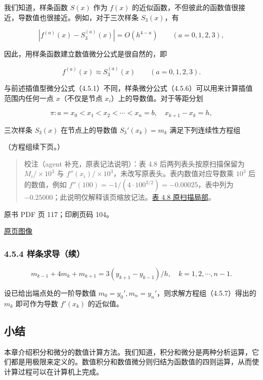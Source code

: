 我们知道，样条函数 \(S(x)\) 作为 \(f(x)\) 的近似函数，不但彼此的函数值很接近，导数值也很接近。例如，对于三次样条 \(S_3(x)\)，有

\[
|f^{(a)}(x)-S_3^{(a)}(x)|=O(h^{4-a})\qquad(a=0,1,2,3),
\]

因此，用样条函数建立数值微分公式是很自然的，即

\[
f^{(a)}(x)\approx S_3^{(a)}(x)\qquad(a=0,1,2,3).
\tag{4.5.6}
\]

与前述插值型微分公式（4.5.1）不同，样条微分公式（4.5.6）可以用来计算插值范围内任何一点 \(x\)（不仅是节点 \(x_i\)）上的导数值。对于等距分划

\[
\pi:a=x_0<x_1<x_2<\cdots<x_n=b,\quad x_{k+1}-x_k=h,
\]

三次样条 \(S_3(x)\) 在节点上的导数值 \(S_3'(x_k)=m_k\) 满足下列连续性方程组

（方程组续下页。）

\begin{quote}
校注（agent 补充，原表记法说明）：表 4.8 后两列表头按原扫描保留为 \(M_i/\times10^3\) 与 \(f''(x_i)/\times10^3\)，未改写原表头。表内数值对应导数乘 \(10^3\) 后的数值，例如 \(f''(100)=-1/(4\cdot100^{3/2})=-0.00025\)，表中列为 \(-0.25000\)；此说明仅解释该页缩放记法。\href{verified/assets/ch04b/review-table-4-8.png}{表 4.8 原扫描局部}。
\end{quote}

\clearpage

原书 PDF 页 117；印刷页码 104。

\href{source-images/pdf-117.jpeg}{原页图像}

\subsubsection{4.5.4 样条求导（续）}\label{ch04b-ux6837ux6761ux6c42ux5bfcux7eed}

\[
m_{k-1}+4m_k+m_{k+1}=3(y_{k+1}-y_{k-1})/h,\quad k=1,2,\cdots,n-1.
\tag{4.5.7}
\]

设已给出端点处的一阶导数值 \(m_0=y_0',m_n=y_n'\)，则求解方程组（4.5.7）得出的 \(m_k\) 即可作为导数 \(f'(x_k)\) 的近似值。

\subsection{小结}\label{ch04b-ux5c0fux7ed3}

本章介绍积分和微分的数值计算方法。我们知道，积分和微分是两种分析运算，它们都是用极限来定义的。数值积分和数值微分则归结为函数值的四则运算，从而使计算过程可以在计算机上完成。

